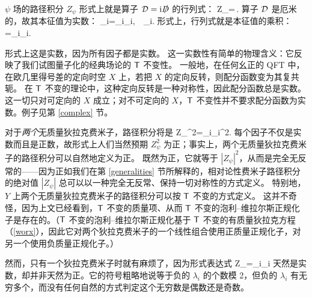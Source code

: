 $\psi$ 场的路径积分 $Z_\psi$ 形式上就是算子 ${\mathcal D}={\mathrm i}\slashed{D}$ 的行列式：
\be\label{deto}Z_\psi=\det\,\D.\ee
算子 ${\mathcal D}$ 是厄米的，故其本征值为实数：
\be\label{meto}\D\psi_i=\lambda_i\psi_i,~~\lambda_i\in\R.\ee
形式上，行列式就是本征值的乘积：
\be\label{peto}\det\,\D=\prod_i\lambda_i.\ee

形式上这是实数，因为所有因子都是实数。
这一实数性有简单的物理含义：它反映了我们试图量子化的经典场论的 ${\sf T}$ 不变性。
一般地，在任何幺正的 QFT 中，在欧几里得号差的定向时空 $X$ 上，若把 $X$ 的定向反转，则配分函数变为其复共轭。
在 ${\sf T}$ 不变的理论中，这种定向反转是一种对称性，因此配分函数总是实数。这一切只对可定向的 $X$ 成立；对不可定向的 $X$，${\sf T}$ 不变性并不要求配分函数为实数。例子见第 \ref{complex} 节。

对于{\it 两个}无质量狄拉克费米子，路径积分将是
\be\label{reto}Z_\psi^2=\prod_i\lambda_i^2. \ee
每个因子不仅是实数而且是正数，故形式上人们当然预期 $Z_\psi^2$ 为正；事实上，两个无质量狄拉克费米子的路径积分可以自然地定义为正。
既然为正，它就等于 $|Z_\psi|^2$，从而是完全无反常的——因为正如我们在第 \ref{generalities} 节所解释的，相对论性费米子路径积分的绝对值 $|Z_\psi|$ 总可以以一种完全无反常、保持一切对称性的方式定义。
特别地，$Y$ 上两个无质量狄拉克费米子的路径积分可以按 ${\sf T}$ 不变的方式定义。
这并不奇怪，因为上文已经看到，${\sf T}$ 不变的质量项、从而 ${\sf T}$ 不变的泡利--维拉尔斯正规化子是存在的。（${\sf T}$ 不变的泡利--维拉尔斯正规化基于 ${\sf T}$ 不变的有质量狄拉克方程（\ref{worx}），因此它对两个狄拉克费米子的一个线性组合使用正质量正规化子，对另一个使用负质量正规化子。）

然而，只有一个狄拉克费米子时就有麻烦了，因为形式表达式
\be\label{wink}Z_\psi=\prod_i\lambda_i \ee
天然是实数，却并非天然为正。它的符号粗略地说等于负的 $\lambda_i$ 的个数模 2，但负的 $\lambda_i$ 有无穷多个，而没有任何自然的方式判定这个无穷数是偶数还是奇数。

